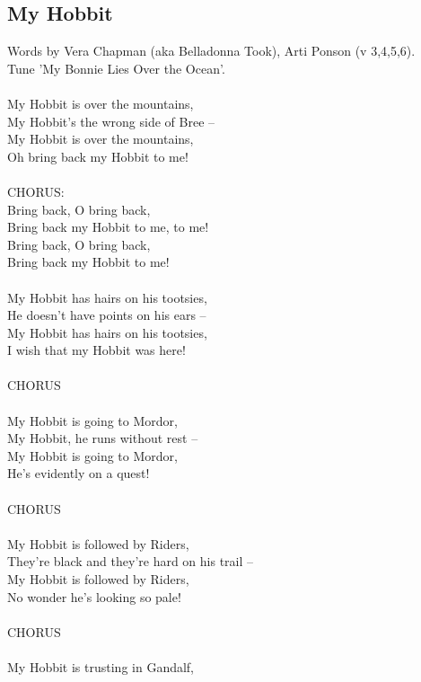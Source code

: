\begin{multicols}{2}
\section{My Hobbit}
Words by Vera Chapman (aka Belladonna Took), Arti Ponson (v 3,4,5,6).
\\
Tune ’My Bonnie Lies Over the Ocean’.
\\
\\
My Hobbit is over the mountains,
\\
My Hobbit’s the wrong side of Bree –
\\
My Hobbit is over the mountains,
\\
Oh bring back my Hobbit to me!
\\
\\
CHORUS:
\\
Bring back, O bring back,
\\
Bring back my Hobbit to me, to me!
\\
Bring back, O bring back,
\\
Bring back my Hobbit to me!
\\
\\
My Hobbit has hairs on his tootsies,
\\
He doesn’t have points on his ears –
\\
My Hobbit has hairs on his tootsies,
\\
I wish that my Hobbit was here!
\\
\\
CHORUS
\\
\\
My Hobbit is going to Mordor,
\\
My Hobbit, he runs without rest –
\\
My Hobbit is going to Mordor,
\\
He’s evidently on a quest!
\\\
\\
CHORUS
\\
\\
My Hobbit is followed by Riders,
\\
They’re black and they’re hard on his trail –
\\
My Hobbit is followed by Riders,
\\
No wonder he’s looking so pale!
\\
\\
CHORUS
\\
\\
My Hobbit is trusting in Gandalf,
\\

\end{multicols}

